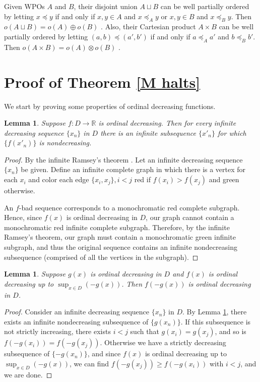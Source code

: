 \documentclass{article}
\newtheorem{Lemma}[Theorem]{Lemma}
\theoremstyle{definition}
\begin{document}
Given WPOs $A$ and $B$, their disjoint union $A\sqcup B$ can be well partially ordered by letting $x\preceq y$ if and only if $x,y\in A$ and $x\preceq_A y$ or $x,y\in B$ and $x\preceq_B y$. Then $o(A\sqcup B) = o(A)\oplus o(B)$ \cite{dejongh_parikh}. Also, their Cartesian product $A\times B$ can be well partially ordered by letting $(a,b)\preceq(a',b')$ if and only if $a\preceq_A a'$ and $b\preceq_B b'$. Then $o(A\times B) = o(A)\otimes o(B)$ \cite{dejongh_parikh}.
    
    \section{Proof of Theorem \ref{M halts}}
    
    We start by proving some properties of ordinal decreasing functions.
    \begin{Lemma}
    \label{perfect subsequence}
        Suppose $f:D\to\mathbb R$ is ordinal decreasing. Then for every infinite decreasing sequence $\{x_n\}$ in $D$ there is an infinite subsequence $\{x'_{n}\}$ for which $\{f(x'_{n})\}$ is nondecreasing.
    \end{Lemma}
    \begin{proof}
        By the infinite Ramsey's theorem \cite{ramsey}. Let an infinite decreasing sequence $\{x_n\}$ be given. Define an infinite complete graph in which there is a vertex for each $x_{i}$ and color each edge $\{x_{i},x_{j}\},i<j$ red if $f(x_{i})>f(x_{j})$ and green otherwise.
        
        An $f$-bad sequence corresponds to a monochromatic red complete subgraph. Hence, since $f(x)$ is ordinal decreasing in $D$, our graph cannot contain a monochromatic red infinite complete subgraph. Therefore, by the infinite Ramsey's theorem, our graph must contain a monochromatic green infinite subgraph, and thus the original sequence contains an infinite nondecreasing subsequence (comprised of all the vertices in the subgraph).
    \end{proof}
    \begin{Lemma}
    \label{closed to composition}
        Suppose $g(x)$ is ordinal decreasing in $D$ and  $f(x)$ is ordinal decreasing up to $ \sup_{x\in D}(-g(x))$. Then $f(-g(x))$ is ordinal decreasing in $D$.
    \end{Lemma}
    \begin{proof}
        Consider an infinite decreasing sequence $\{x_{n}\}$ in $D$. By Lemma \ref{perfect subsequence}, there exists an infinite nondecreasing subsequence of $\{g(x_{n})\}$. If this subsequence is not strictly increasing, there exists  $i<j$ such that $g(x_i)=g(x_j)$, and so is $f(-g(x_i))=f(-g(x_j))$. Otherwise we have a strictly decreasing subsequence of $\{-g(x_n)\}$, and since $f(x)$ is ordinal decreasing up to $\sup_{x\in D}(-g(x))$, we can find $f(-g(x_j))\geq f(-g(x_i))$ with $i<j$, and we are done.
    \end{proof}
\end{document}
